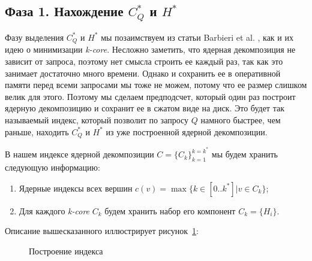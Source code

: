 \documentclass[11pt,a4paper,oneside]{article}
\begin{document}
\subsection{Фаза 1. Нахождение $C_Q^*$ и $H^*$}

Фазу выделения $C_Q^*$ и $H^*$ мы позаимствуем из статьи Barbieri et al. \cite{Barbieri15}, как и их идею о минимизации \textit{k-core}. Несложно заметить, что ядерная декомпозиция не зависит от запроса, поэтому нет смысла строить ее каждый раз, так как это занимает достаточно много времени. Однако и сохранить ее в оперативной памяти перед всеми запросами мы тоже не можем, потому что ее размер слишком велик для этого. Поэтому мы сделаем предподсчет, который один раз построит ядерную декомпозицию и сохранит ее в сжатом виде на диск. Это будет так называемый индекс, который позволит по запросу $Q$ намного быстрее, чем раньше, находить $C_Q^*$ и $H^*$ из уже построенной ядерной декомпозиции.

В нашем индексе ядерной декомпозиции $C = \{C_k\}_{k = 1}^{k = k^*}$ мы будем хранить следующую информацию:

\begin{enumerate}
  \item Ядерные индексы всех вершин $c(v) = \max\{k \in [0..k^*] | v \in C_k \}$;
  \item Для каждого \textit{k-core} $C_k$ будем хранить набор его компонент $C_k = \{H_i\}$.
\end{enumerate}

Описание вышесказанного иллюстрирует рисунок~\ref{index-construct}:

\begin{figure}[!h]
\caption{Построение индекса}\label{index-construct}
\centering
  \begin{center}
  \end{center}
\end{figure}
\FloatBarrier
\end{document}
